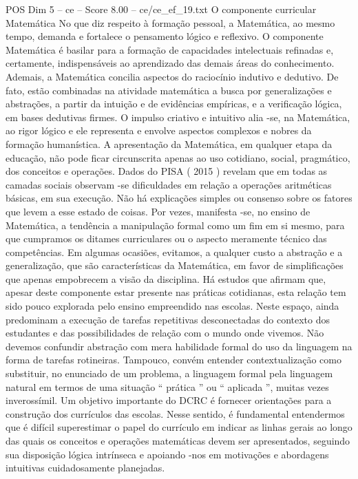 \begin{textsample}{POS Dim 5 – ce – Score 8.00 – ce/ce\_ef\_19.txt}  \label{ex:f5_pos_251}
O componente curricular Matemática No que diz respeito à formação pessoal, a Matemática, ao mesmo tempo, demanda e fortalece o pensamento lógico e reflexivo.
O componente Matemática é basilar para a formação de capacidades intelectuais refinadas e, certamente, indispensáveis ao aprendizado das demais áreas do conhecimento.
Ademais, a Matemática concilia aspectos do raciocínio indutivo e dedutivo.
De fato, estão combinadas na atividade matemática a busca por generalizações e abstrações, a partir da intuição e de evidências empíricas, e a verificação lógica, em bases dedutivas firmes.
O impulso criativo e intuitivo alia -se, na Matemática, ao rigor lógico e ele representa e envolve aspectos complexos e nobres da formação humanística.
A apresentação da Matemática, em qualquer etapa da educação, não pode ficar circunscrita apenas ao uso cotidiano, social, pragmático, dos conceitos e operações.
Dados do PISA ( 2015 ) revelam que em todas as camadas sociais observam -se dificuldades em relação a operações aritméticas básicas, em sua execução.
Não há explicações simples ou consenso sobre os fatores que levem a esse estado de coisas.
Por vezes, manifesta -se, no ensino de Matemática, a tendência a manipulação formal como um fim em si mesmo, para que cumpramos os ditames curriculares ou o aspecto meramente técnico das competências.
Em algumas ocasiões, evitamos, a qualquer custo a abstração e a generalização, que são características da Matemática, em favor de simplificações que apenas empobrecem a visão da disciplina.
Há estudos que afirmam que, apesar deste componente estar presente nas práticas cotidianas, esta relação tem sido pouco explorada pelo ensino empreendido nas escolas.
Neste espaço, ainda predominam a execução de tarefas repetitivas desconectadas do contexto dos estudantes e das possibilidades de relação com o mundo onde vivemos.
Não devemos confundir abstração com mera habilidade formal do uso da linguagem na forma de tarefas rotineiras.
Tampouco, convém entender contextualização como substituir, no enunciado de um problema, a linguagem formal pela linguagem natural em termos de uma situação “ prática ” ou “ aplicada ”, muitas vezes inverossímil.
Um objetivo importante do DCRC é fornecer orientações para a construção dos currículos das escolas.
Nesse sentido, é fundamental entendermos que é difícil superestimar o papel do currículo em indicar as linhas gerais ao longo das quais os conceitos e operações matemáticas devem ser apresentados, seguindo sua disposição lógica intrínseca e apoiando -nos em motivações e abordagens intuitivas cuidadosamente planejadas.

\end{textsample}
